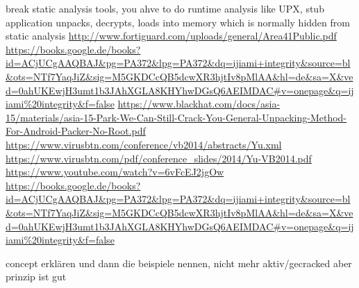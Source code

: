 break static analysis tools, you ahve to do runtime analysis\newline
like UPX, stub application unpacks, decrypts, loads into memory which is normally hidden from static analysis\newline
\url{http://www.fortiguard.com/uploads/general/Area41Public.pdf}\newline
\url{https://books.google.de/books?id=ACjUCgAAQBAJ\&pg=PA372\&lpg=PA372\&dq=ijiami+integrity\&source=bl\&ots=NTf7YaqJiZ\&sig=M5GKDCcQB5dcwXR3hjtIv8pMlAA\&hl=de\&sa=X\&ved=0ahUKEwjH3umt1b3JAhXGLA8KHYhwDGsQ6AEIMDAC\#v=onepage\&q=ijiami%20integrity\&f=false}\newline
\url{https://www.blackhat.com/docs/asia-15/materials/asia-15-Park-We-Can-Still-Crack-You-General-Unpacking-Method-For-Android-Packer-No-Root.pdf}\newline
\url{https://www.virusbtn.com/conference/vb2014/abstracts/Yu.xml}\newline
\url{https://www.virusbtn.com/pdf/conference_slides/2014/Yu-VB2014.pdf}\newline
\url{https://www.youtube.com/watch?v=6vFcEJ2jgOw}\newline
\url{https://books.google.de/books?id=ACjUCgAAQBAJ&pg=PA372&lpg=PA372&dq=ijiami+integrity&source=bl&ots=NTf7YaqJiZ&sig=M5GKDCcQB5dcwXR3hjtIv8pMlAA&hl=de&sa=X&ved=0ahUKEwjH3umt1b3JAhXGLA8KHYhwDGsQ6AEIMDAC#v=onepage&q=ijiami%20integrity&f=false}\newline

concept erklären und dann die beispiele nennen, nicht mehr aktiv/gecracked aber prinzip ist gut\newline
